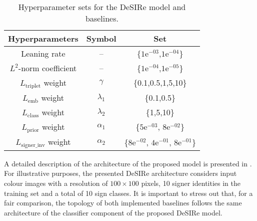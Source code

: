 \begin{table}[t]
    \centering
        \begin{tabular}{c|c|c}
            Hyperparameters                    & Symbol & Set                \\\hline
            Leaning rate                                & --       & \{$1\text{e}^{-03}$,$1\text{e}^{-04}$\}             \\
            $L^2$-norm coefficient                              & --      & \{$1\text{e}^{-04}$,$1\text{e}^{-05}$\}             \\
            $L_{\text{triplet}}$ weight                 & $\gamma$                & \{0.1,0.5,1,5,10\}                  \\
            $L_{\text{emb}}$ weight                 & $\lambda_{1}$                & \{0.1,0.5\}                  \\
            $L_{\text{class}}$ weight                 & $\lambda_{2}$                & \{1,5,10\}                  \\
            $L_{\text{prior}}$ weight                 & $\alpha_{1}$                & \{$5\text{e}^{-03}$, $8\text{e}^{-02}$\}                  \\
            $L_{\text{signer\_inv}}$ weight                 & $\alpha_{2}$                & \{$8\text{e}^{-02}$, $4\text{e}^{-01}$, $8\text{e}^{-01}$\}                  \\
        \end{tabular}
    \caption{Hyperparameter sets for the DeSIRe model and baselines.}
    \label{tab:desire_hyperparam}
\end{table}


A detailed description of the architecture of the proposed model is presented in . For illustrative purposes, the presented DeSIRe architecture considers input colour images with a resolution of $100\times 100$ pixels, 10 signer identities in the training set and a total of 10 sign classes. It is important to stress out that, for a fair comparison, the topology of both implemented baselines follows the same architecture of the classifier component of the proposed DeSIRe model.

